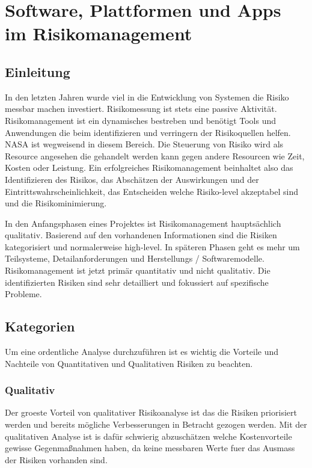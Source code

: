 \chapter{Software, Plattformen und Apps im Risikomanagement}

\section{Einleitung}

In den letzten Jahren wurde viel in die Entwicklung von Systemen die Risiko messbar machen investiert. Risikomessung ist stets eine passive Aktivität. Risikomanagement ist ein dynamisches bestreben und benötigt Tools und Anwendungen die beim identifizieren und verringern der Risikoquellen helfen. \cite{Mausser1997} 
NASA ist wegweisend in diesem Bereich. Die Steuerung von Risiko wird als Resource angesehen die gehandelt werden kann gegen andere Resourcen wie Zeit, Kosten oder Leistung. Ein erfolgreiches Risikomanagement beinhaltet also das Identifizieren des Risikos, das Abschätzen der Auswirkungen und der Eintrittswahrscheinlichkeit, das Entscheiden welche Risiko-level akzeptabel sind und die Risikominimierung.\cite{Feather2000}

In den Anfangsphasen eines Projektes ist Risikomanagement hauptsächlich qualitativ. Basierend auf den vorhandenen Informationen sind die Risiken kategorisiert und normalerweise high-level. In späteren Phasen geht es mehr um Teilsysteme, Detailanforderungen und Herstellungs / Softwaremodelle. Risikomanagement ist jetzt primär quantitativ und nicht qualitativ. Die identifizierten Risiken sind sehr detailliert und fokussiert auf spezifische Probleme.\cite{Feather2000}


\section{Kategorien}

Um eine ordentliche Analyse durchzuführen ist es wichtig die Vorteile und Nachteile von Quantitativen und Qualitativen Risiken zu beachten.\cite{Stoneburner2002}

\subsection{Qualitativ}
Der groeste Vorteil von qualitativer Risikoanalyse ist das die Risiken priorisiert werden und bereits mögliche Verbesserungen in Betracht gezogen werden.
Mit der qualitativen Analyse ist is dafür schwierig abzuschätzen welche Kostenvorteile gewisse Gegenmaßnahmen haben, da keine messbaren Werte fuer das Ausmass der Risiken vorhanden sind.\cite{Stoneburner2002}
